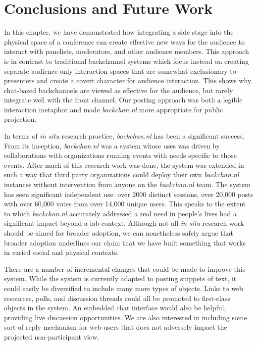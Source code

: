 \section{Conclusions and Future Work}
In this chapter, we have demonstrated how integrating a side stage into the physical space of a conference can create effective new ways for the audience to interact with panelists, moderators, and other audience members. This approach is in contrast to traditional backchannel systems which focus instead on creating separate audience-only interaction spaces that are somewhat exclusionary to presenters and create a covert character for audience interaction. This shows why chat-based backchannels are viewed as effective for the audience, but rarely integrate well with the front channel. Our posting approach was both a legible interaction metaphor and made \emph{backchan.nl} more appropriate for public projection.

In terms of \emph{in situ} research practice, \emph{backchan.nl} has been a significant success. From its inception, \emph{backchan.nl} was a system whose uses was driven by collaborations with organizations running events with needs specific to those events. After much of this research work was done, the system was extended in such a way that third party organizations could deploy their own \emph{backchan.nl} instances without intervention from anyone on the \emph{backchan.nl} team. The system has seen significant independent use: over 2000 distinct sessions, over 20,000 posts with over 60,000 votes from over 14,000 unique users. This speaks to the extent to which \emph{backchan.nl} accurately addressed a real need in people's lives had a significant impact beyond a lab context. Although not all \emph{in situ} research work should be aimed for broader adoption, we can nonetheless safely argue that broader adoption underlines our claim that we have built something that works in varied social and physical contexts.

There are a number of incremental changes that could be made to improve this system. While the system is currently adapted to posting snippets of text, it could easily be diversified to include many more types of objects. Links to web resources, polls, and discussion threads could all be promoted to first-class objects in the system. An embedded chat interface would also be helpful, providing live discussion opportunities. We are also interested in including some sort of reply mechanism for web-users that does not adversely impact the projected non-participant view. 

